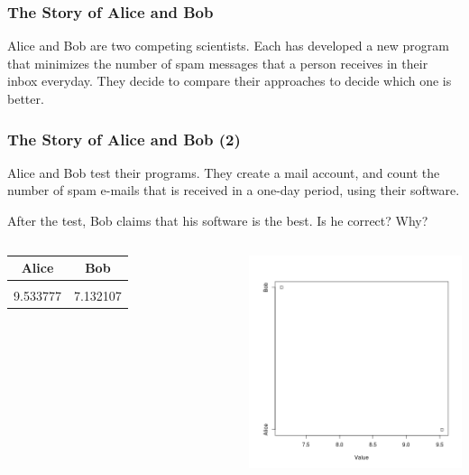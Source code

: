 \documentclass[10pt]{beamer}
\begin{document}
\begin{frame}
  \frametitle{The Story of Alice and Bob}
  \begin{block}{}
    Alice and Bob are two competing scientists.
    \bigskip
    Each has developed a new program that minimizes the number of spam
    messages that a person receives in their inbox everyday.
    \bigskip
    They decide to compare their approaches to decide which one is
    better.
  \end{block}
\end{frame}

\begin{frame}
  \frametitle{The Story of Alice and Bob (2)}
  \begin{block}{}
    Alice and Bob test their programs. They create a mail account, and
    count the number of spam e-mails that is received in a one-day
    period, using their software. 
  \end{block}
  \begin{block}{}
    After the test, Bob claims that his software is the best. Is he
    correct? Why?
  \end{block}
  \begin{columns}[c]
    \begin{tabular}{c|c}
      Alice & Bob \\
      \hline\\
      9.533777 & 7.132107
    \end{tabular}
    \includegraphics[width=.7\textwidth]{img/AliceBob_1}
  \end{columns}
\end{frame}
\end{document}
